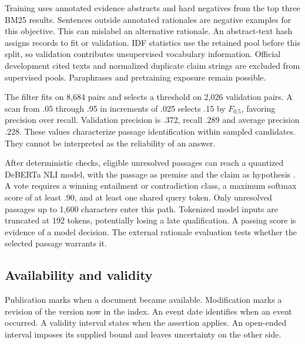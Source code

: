 Training uses annotated evidence abstracts and hard negatives from the top three BM25 results. Sentences outside annotated rationales are negative examples for this objective. This can mislabel an alternative rationale. An abstract-text hash assigns records to fit or validation. IDF statistics use the retained pool before this split, so validation contributes unsupervised vocabulary information. Official development cited texts and normalized duplicate claim strings are excluded from supervised pools. Paraphrases and pretraining exposure remain possible.

The filter fits on 8,684 pairs and selects a threshold on 2,026 validation pairs. A scan from .05 through .95 in increments of .025 selects .15 by $F_{0.5}$, favoring precision over recall. Validation precision is .372, recall .289 and average precision .228. These values characterize passage identification within sampled candidates. They cannot be interpreted as the reliability of an answer.

After deterministic checks, eligible unresolved passages can reach a quantized DeBERTa NLI model, with the passage as premise and the claim as hypothesis \cite{SNLI}. A vote requires a winning entailment or contradiction class, a maximum softmax score of at least .90, and at least one shared query token. Only unresolved passages up to 1,600 characters enter this path. Tokenized model inputs are truncated at 192 tokens, potentially losing a late qualification. A passing score is evidence of a model decision. The external rationale evaluation tests whether the selected passage warrants it.

\subsection{Availability and validity}
Publication marks when a document became available. Modification marks a revision of the version now in the index. An event date identifies when an event occurred. A validity interval states when the assertion applies. An open-ended interval imposes its supplied bound and leaves uncertainty on the other side.

